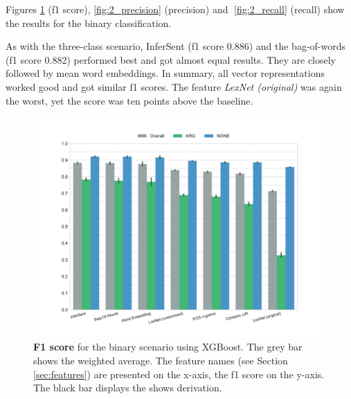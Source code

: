 \FloatBarrier

Figures \ref{fig:2_f1} (f1 score), \ref{fig:2_precision} (precision) and \ref{fig:2_recall} (recall) show the results for the binary classification.

As with the three-class scenario, InferSent (f1 score 0.886) and the bag-of-words (f1 score 0.882) performed best and got almost equal results. They are closely followed by mean word embeddings. In summary, all vector representations worked good and got similar f1 scores. The feature \emph{LexNet (original)} was again the worst, yet the score was ten points above the baseline.%
\begin{figure}[htb]
      \caption{\textbf{F1 score} for the binary scenario using XGBoost. The grey bar shows the weighted average. The feature names (see Section \ref{sec:features}) are presented on the x-axis, the f1 score on the y-axis. The black bar displays the shows derivation.} 
 
    \label{fig:2_f1}
 \centering
	\includegraphics[width=1\textwidth]{images/experiments/f1-True}

\end{figure}





